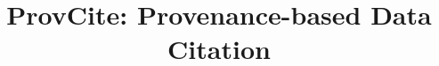 \documentclass{vldb}
\begin{document}

\title{ProvCite: Provenance-based Data Citation}




%
%
%
%

\end{document}
